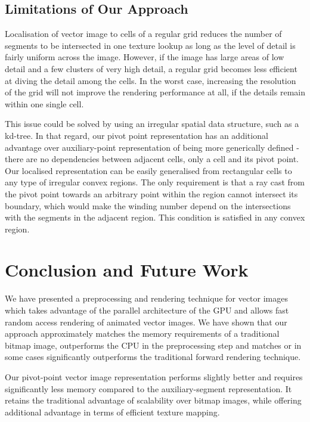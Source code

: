 \documentclass[11pt,a4paper,twoside]{article}
\begin{document}
\subsection {Limitations of Our Approach}

Localisation of vector image to cells of a regular grid reduces the number of segments to be intersected in one texture lookup as long as the level of detail is fairly uniform across the image. However, if the image has large areas of low detail and a few clusters of very high detail, a regular grid becomes less efficient at diving the detail among the cells. In the worst case, increasing the resolution of the grid will not improve the rendering performance at all, if the details remain within one single cell.

This issue could be solved by using an irregular spatial data structure, such as a kd-tree. In that regard, our pivot point representation has an additional advantage over auxiliary-point representation of being more generically defined - there are no dependencies between adjacent cells, only a cell and its pivot point. Our localised representation can be easily generalised from rectangular cells to any type of irregular convex regions. The only requirement is that a ray cast from the pivot point towards an arbitrary point within the region cannot intersect its boundary, which would make the winding number depend on the intersections with the segments in the adjacent region. This condition is satisfied in any convex region.

\section {Conclusion and Future Work}

We have presented a preprocessing and rendering technique for vector images which takes advantage of the parallel architecture of the GPU and allows fast random access rendering of animated vector images. We have shown that our approach approximately matches the memory requirements of a traditional bitmap image, outperforms the CPU in the preprocessing step and matches or in some cases significantly outperforms the traditional forward rendering technique.

Our pivot-point vector image representation performs slightly better and requires significantly less memory compared to the auxiliary-segment representation. It retains the traditional advantage of scalability over bitmap images, while offering additional advantage in terms of efficient texture mapping.
\end{document}
